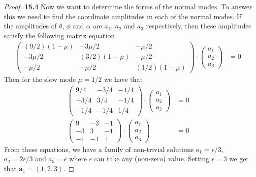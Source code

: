 \documentclass[11pt]{article}
\theoremstyle{definition}
\begin{document}
\begin{proof}{\textbf{15.4}}
    Now we want to determine the forms of the normal modes.
    To answer this we need to ﬁnd the coordinate amplitudes in each of
    the normal modes.
    If the amplitudes of $\theta$, $\phi$ and $\alpha$ are $a_1$, $a_2$
    and $a_3$ respectively, then these amplitudes satisfy
    the following matrix equation
    \begin{align*}
        \begin{pmatrix}
            (9/2)(1 - \mu) & - 3\mu/2 & -\mu/2\\
            - 3\mu/2 & (3/2)(1 - \mu) & -\mu/2\\
            -\mu/2 & -\mu/2 & (1/2)(1 - \mu)
        \end{pmatrix}\cdot
        \begin{pmatrix}
            a_1\\ a_2 \\ a_3
        \end{pmatrix}
        &= 0
    \end{align*}    
    Then for the slow mode $\mu = 1/2$ we have that
    \begin{align*}
        \begin{pmatrix}
            9/4 & -3/4 & -1/4\\
            -3/4 & 3/4 & -1/4\\
            -1/4 & -1/4 & 1/4
        \end{pmatrix}\cdot
        \begin{pmatrix}
            a_1\\ a_2\\ a_3
        \end{pmatrix}
        &= 0\\
        \begin{pmatrix}
            9 & -3 & -1\\
            -3 & 3 & -1\\
            -1 & -1 & 1
        \end{pmatrix}\cdot
        \begin{pmatrix}
            a_1\\ a_2\\ a_3
        \end{pmatrix}
        &= 0
    \end{align*}
    From these equations, we have a family of non-trivial solutions
    $a_1 = \epsilon/3$, $a_2 = 2\epsilon/3$ and $a_3 = \epsilon$
    where $\epsilon$ can take any (non-zero) value. Setting $\epsilon = 3$
    we get that $\bm{a}_1 = (1, 2, 3)$.


\end{proof}
\end{document}
